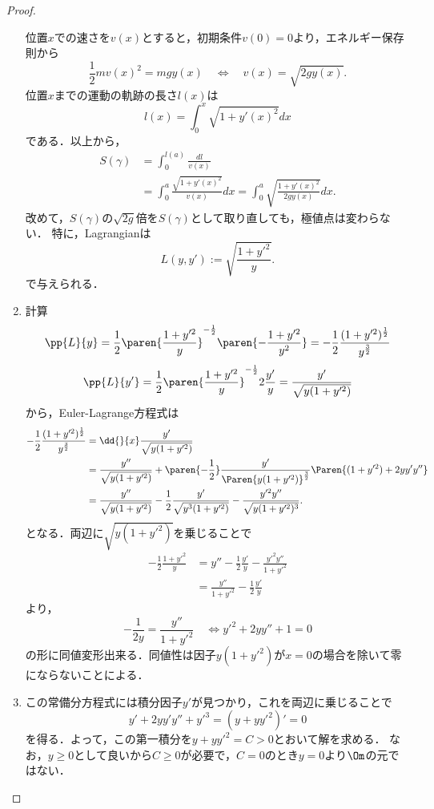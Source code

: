 \documentclass[uplatex,dvipdfmx]{jsarticle}
\begin{document}
\begin{proof}
\begin{enumerate}[{Step}1]
        位置$x$での速さを$v(x)$とすると，初期条件$v(0)=0$より，エネルギー保存則から
        \[\frac{1}{2}mv(x)^2=mgy(x)\quad\Leftrightarrow\quad v(x)=\sqrt{2gy(x)}.\]
        位置$x$までの運動の軌跡の長さ$l(x)$は
        \[l(x)=\int^x_0\sqrt{1+y'(x)^2}dx\]
        である．以上から，
        \begin{align*}
            S(\gamma)&=\int^{l(a)}_0\frac{dl}{v(x)}\\
            &=\int^a_0\frac{\sqrt{1+y'(x)^2}}{v(x)}dx=\int^a_0\sqrt{\frac{1+y'(x)^2}{2gy(x)}}dx.
        \end{align*}
        改めて，$S(\gamma)$の$\sqrt{2g}$倍を$S(\gamma)$として取り直しても，極値点は変わらない．
        特に，Lagrangianは
        \[L(y,y'):=\sqrt{\frac{1+y'^2}{y}}.\]
        で与えられる．
        \item 計算
        \[\pp{L}{y}=\frac{1}{2}\paren{\frac{1+y'^2}{y}}^{-\frac{1}{2}}\paren{-\frac{1+y'^2}{y^2}}=-\frac{1}{2}\frac{(1+y'^2)^{\frac{1}{2}}}{y^{\frac{3}{2}}}\]
        \[\pp{L}{y'}=\frac{1}{2}\paren{\frac{1+y'^2}{y}}^{-\frac{1}{2}}2\frac{y'}{y}=\frac{y'}{\sqrt{y(1+y'^2)}}\]
        から，Euler-Lagrange方程式は
        \begin{align*}
            -\frac{1}{2}\frac{(1+y'^2)^{\frac{1}{2}}}{y^{\frac{3}{2}}}&=\dd{}{x}\frac{y'}{\sqrt{y(1+y'^2)}}\\
            &=\frac{y''}{\sqrt{y(1+y'^2)}}+\paren{-\frac{1}{2}}\frac{y'}{\Paren{y(1+y'^2)}^{\frac{3}{2}}}\Paren{(1+y'^2)+2yy'y''}\\
            &=\frac{y''}{\sqrt{y(1+y'^2)}}-\frac{1}{2}\frac{y'}{\sqrt{y^3(1+y'^2)}}-\frac{y'^2y''}{\sqrt{y(1+y'^2)^3}}.
        \end{align*}
        となる．両辺に$\sqrt{y(1+y'^2)}$を乗じることで
        \begin{align*}
            -\frac{1}{2}\frac{1+y'^2}{y}&=y''-\frac{1}{2}\frac{y'}{y}-\frac{y'^2y''}{1+y'^2}\\
            &=\frac{y''}{1+y'^2}-\frac{1}{2}\frac{y'}{y}
        \end{align*}
        より，
        \[-\frac{1}{2y}=\frac{y''}{1+y'^2}\quad\Leftrightarrow y'^2+2yy''+1=0\]
        の形に同値変形出来る．同値性は因子$y(1+y'^2)$が$x=0$の場合を除いて零にならないことによる．
        \item この常備分方程式には積分因子$y'$が見つかり，これを両辺に乗じることで
        \[y'+2yy'y''+y'^3=(y+yy'^2)'=0\]
        を得る．よって，この第一積分を$y+yy'^2=C>0$とおいて解を求める．
        なお，$y\ge 0$として良いから$C\ge0$が必要で，$C=0$のとき$y=0$より$\Om$の元ではない．

\end{enumerate}
\end{proof}
\end{document}
